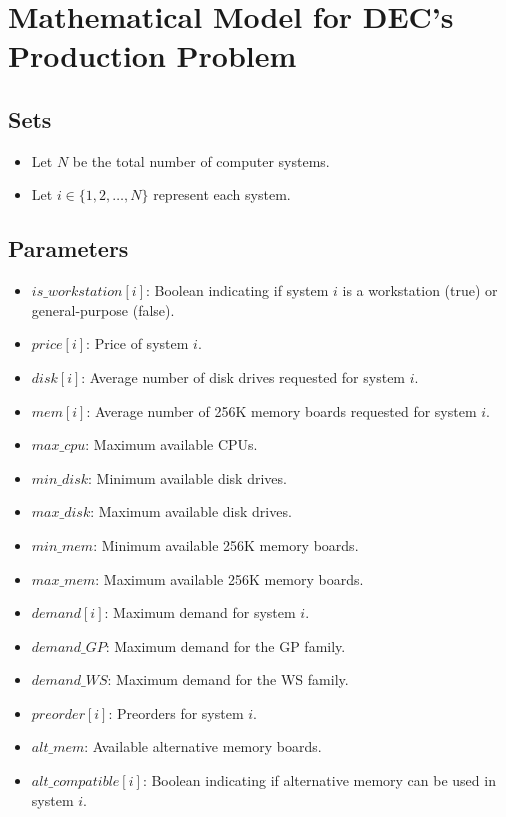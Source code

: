 \documentclass{article}
\begin{document}
\section*{Mathematical Model for DEC's Production Problem}

\subsection*{Sets}
\begin{itemize}
    \item Let \( N \) be the total number of computer systems.
    \item Let \( i \in \{1, 2, \ldots, N\} \) represent each system.
\end{itemize}

\subsection*{Parameters}
\begin{itemize}
    \item \( is\_workstation[i] \): Boolean indicating if system \( i \) is a workstation (true) or general-purpose (false).
    \item \( price[i] \): Price of system \( i \).
    \item \( disk[i] \): Average number of disk drives requested for system \( i \).
    \item \( mem[i] \): Average number of 256K memory boards requested for system \( i \).
    \item \( max\_cpu \): Maximum available CPUs.
    \item \( min\_disk \): Minimum available disk drives.
    \item \( max\_disk \): Maximum available disk drives.
    \item \( min\_mem \): Minimum available 256K memory boards.
    \item \( max\_mem \): Maximum available 256K memory boards.
    \item \( demand[i] \): Maximum demand for system \( i \).
    \item \( demand\_GP \): Maximum demand for the GP family.
    \item \( demand\_WS \): Maximum demand for the WS family.
    \item \( preorder[i] \): Preorders for system \( i \).
    \item \( alt\_mem \): Available alternative memory boards.
    \item \( alt\_compatible[i] \): Boolean indicating if alternative memory can be used in system \( i \).
\end{itemize}
\end{document}

